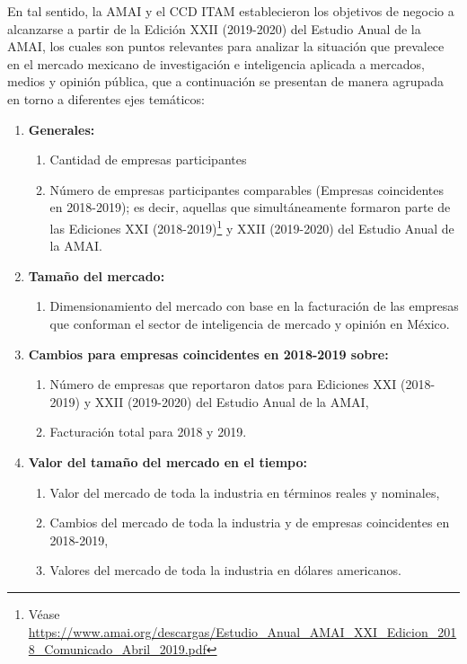 En tal sentido, la AMAI y el CCD ITAM establecieron los objetivos de negocio a alcanzarse a partir de la Edición  XXII  (2019-2020) del Estudio Anual de la AMAI, los cuales son puntos relevantes para analizar la situación que prevalece en el mercado mexicano de investigación e inteligencia aplicada a mercados, medios y opinión pública, que a continuación se presentan de manera agrupada en torno a diferentes ejes temáticos:

\begin{enumerate}
    \item \textbf{Generales:}
        \begin{enumerate}
        \item Cantidad de empresas participantes
        \item Número de empresas participantes comparables (Empresas coincidentes en 2018-2019); es decir, aquellas que simultáneamente formaron parte de las Ediciones XXI (2018-2019)\footnote{Véase \url{https://www.amai.org/descargas/Estudio_Anual_AMAI_XXI_Edicion_2018_Comunicado_Abril_2019.pdf}} y XXII (2019-2020) del Estudio Anual de la AMAI.
        \end{enumerate}
    
    \item \textbf{Tamaño del mercado:}
        \begin{enumerate}
        \item Dimensionamiento del mercado con base en la facturación de las empresas que conforman el sector de inteligencia de mercado y opinión en México.
        \end{enumerate}
        
    \item \textbf{Cambios para empresas coincidentes en 2018-2019 sobre:}
        \begin{enumerate}
        \item Número de empresas que reportaron datos para Ediciones XXI (2018-2019) y XXII (2019-2020) del Estudio Anual de la AMAI,
        \item Facturación total para 2018 y 2019.
        \end{enumerate}
        
    \item \textbf{Valor del tamaño del mercado en el tiempo:}
        \begin{enumerate}
        \item Valor del mercado de toda la industria en términos reales y nominales,
        \item Cambios del mercado de toda la industria y de empresas coincidentes en 2018-2019,
        \item Valores del mercado de toda la industria en dólares americanos.
        \end{enumerate}
    

\end{enumerate}
